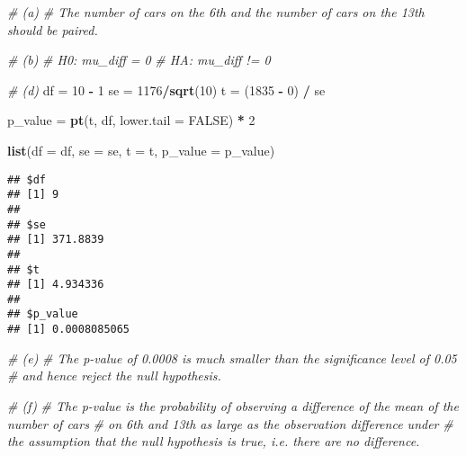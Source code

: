 \documentclass[]{book}
\newenvironment{Shaded}{\begin{snugshade}}{\end{snugshade}}
\newcommand{\CommentTok}[1]{\textcolor[rgb]{0.56,0.35,0.01}{\textit{#1}}}
\newcommand{\DataTypeTok}[1]{\textcolor[rgb]{0.13,0.29,0.53}{#1}}
\newcommand{\DecValTok}[1]{\textcolor[rgb]{0.00,0.00,0.81}{#1}}
\newcommand{\KeywordTok}[1]{\textcolor[rgb]{0.13,0.29,0.53}{\textbf{#1}}}
\newcommand{\NormalTok}[1]{#1}
\newcommand{\OperatorTok}[1]{\textcolor[rgb]{0.81,0.36,0.00}{\textbf{#1}}}
\newcommand{\OtherTok}[1]{\textcolor[rgb]{0.56,0.35,0.01}{#1}}
\newcommand{\StringTok}[1]{\textcolor[rgb]{0.31,0.60,0.02}{#1}}
\begin{document}
\begin{Shaded}
\begin{Highlighting}[]
\CommentTok{# (a)}
\CommentTok{# The number of cars on the 6th and the number of cars on the 13th should be paired.}
\end{Highlighting}
\end{Shaded}

\begin{Shaded}
\begin{Highlighting}[]
\CommentTok{# (b)}
\CommentTok{# H0: mu_diff = 0}
\CommentTok{# HA: mu_diff != 0}
\end{Highlighting}
\end{Shaded}

\begin{Shaded}
\begin{Highlighting}[]
\CommentTok{# (d)}
\NormalTok{df =}\StringTok{ }\DecValTok{10} \OperatorTok{-}\StringTok{ }\DecValTok{1}
\NormalTok{se =}\StringTok{ }\DecValTok{1176}\OperatorTok{/}\KeywordTok{sqrt}\NormalTok{(}\DecValTok{10}\NormalTok{)}
\NormalTok{t =}\StringTok{ }\NormalTok{(}\DecValTok{1835} \OperatorTok{-}\StringTok{ }\DecValTok{0}\NormalTok{) }\OperatorTok{/}\StringTok{ }\NormalTok{se}

\NormalTok{p_value =}\StringTok{ }\KeywordTok{pt}\NormalTok{(t, df, }\DataTypeTok{lower.tail =} \OtherTok{FALSE}\NormalTok{) }\OperatorTok{*}\StringTok{ }\DecValTok{2}

\KeywordTok{list}\NormalTok{(}\DataTypeTok{df =}\NormalTok{ df, }\DataTypeTok{se =}\NormalTok{ se, }\DataTypeTok{t =}\NormalTok{ t, }\DataTypeTok{p_value =}\NormalTok{ p_value)}
\end{Highlighting}
\end{Shaded}

\begin{verbatim}
## $df
## [1] 9
## 
## $se
## [1] 371.8839
## 
## $t
## [1] 4.934336
## 
## $p_value
## [1] 0.0008085065
\end{verbatim}

\begin{Shaded}
\begin{Highlighting}[]
\CommentTok{# (e)}
\CommentTok{# The p-value of 0.0008 is much smaller than the significance level of 0.05}
\CommentTok{# and hence reject the null hypothesis. }
\end{Highlighting}
\end{Shaded}

\begin{Shaded}
\begin{Highlighting}[]
\CommentTok{# (f)}
\CommentTok{# The p-value is the probability of observing a difference of the mean of the number of cars}
\CommentTok{# on 6th and 13th as large as the observation difference under}
\CommentTok{# the assumption that the null hypothesis is true, i.e. there are no difference.}
\end{Highlighting}
\end{Shaded}
\end{document}
